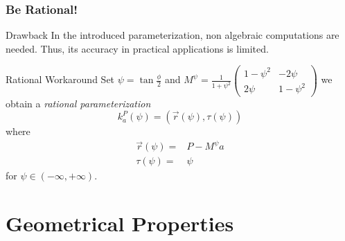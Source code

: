 \documentclass[ucs,9pt,pagenumbersfull]{beamer}
\begin{document}
\begin{frame}
  \frametitle{Be Rational!}
  \begin{block}{Drawback}
    In the introduced parameterization, non algebraic computations are
    needed. Thus, its accuracy in practical applications is limited.
  \end{block}
  \begin{block}{Rational Workaround}
    Set \(\psi=\tan \frac{\phi}{2}\) and %
    \(
    M^\psi = \frac{1}{1+\psi^2}\begin{pmatrix}
      1-\psi^2 & -2 \psi \\
      2\psi & 1-\psi^2
    \end{pmatrix}
    \) %
    we obtain a \emph{rational parameterization}
    \[
    k^P_a(\psi) = \left( \vec{r}(\psi),\tau(\psi)\right)
    \]
    where
    \begin{align*}
      \vec{r}(\psi) = & P - M^\psi a\\
      \tau(\psi) = & \psi
    \end{align*}
for \(\psi\in (-\infty,+\infty)\).
  \end{block}
\end{frame}

\section{Geometrical Properties}
\end{document}
